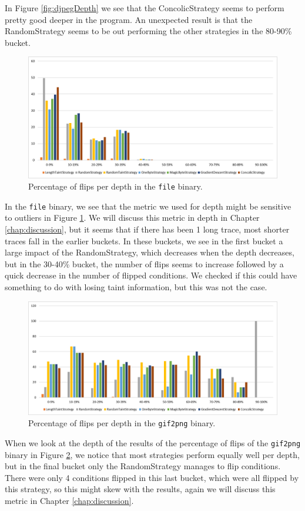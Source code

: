 In Figure \ref{fig:djpegDepth} we see that the ConcolicStrategy seems to perform pretty good deeper in the program. An unexpected result is that the RandomStrategy seems to be out performing the other strategies in the 80-90\% bucket.
\begin{figure}[H]
    \centering
    \includegraphics[width=.8\linewidth]{5_results/graphs/file-depth.png}  
    \caption{Percentage of flips per depth in the \texttt{file} binary.}
    \label{fig:fileDepth}
\end{figure}
In the \texttt{file} binary, we see that the metric we used for depth might be sensitive to outliers in Figure \ref{fig:fileDepth}. We will discuss this metric in depth in Chapter \ref{chap:discussion}, but it seems that if there has been 1 long trace, most shorter traces fall in the earlier buckets. In these buckets, we see in the first bucket a large impact of the RandomStrategy, which decreases when the depth decreases, but in the 30-40\% bucket, the number of flips seems to increase followed by a quick decrease in the number of flipped conditions. We checked if this could have something to do with losing taint information, but this was not the case.
\begin{figure}[H]
    \centering
    \includegraphics[width=.8\linewidth]{5_results/graphs/gif2png-depth.png}  
    \caption{Percentage of flips per depth in the \texttt{gif2png} binary.}
    \label{fig:gif2pngDepth}
\end{figure}
When we look at the depth of the results of the percentage of flips of the \texttt{gif2png} binary in Figure \ref{fig:gif2pngDepth}, we notice that most strategies perform equally well per depth, but in the final bucket only the RandomStrategy manages to flip conditions. There were only 4 conditions flipped in this last bucket, which were all flipped by this strategy, so this might skew with the results, again we will discuss this metric in Chapter \ref{chap:discussion}.
